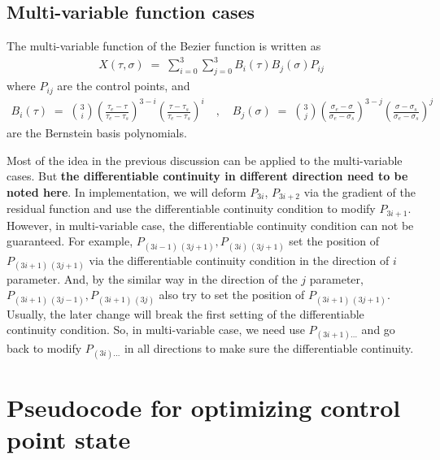 \documentclass[12pt]{article}
\begin{document}
\subsection{Multi-variable function cases}


The multi-variable function of the Bezier function is written as
%
\begin{align}
	X(\tau,\sigma) \;=\; \sum_{i=0}^3 \sum_{j=0}^3 B_i(\tau) B_j(\sigma) P_{ij}
\end{align}
%
where $P_{ij}$ are the control points, and
%
\begin{align*}
	B_i(\tau) \;=\; \binom{3}{i} \left( \frac{\tau_e - \tau}{\tau_e - \tau_s} \right)^{3-i} \left( \frac{\tau - \tau_s}{\tau_e - \tau_s} \right)^{i} \quad,\quad B_j(\sigma) \;=\; \binom{3}{j} \left( \frac{\sigma_e - \sigma}{\sigma_e - \sigma_s} \right)^{3-j} \left( \frac{\sigma - \sigma_s}{\sigma_e - \sigma_s} \right)^{j}
\end{align*}
%
are the Bernstein basis polynomials.


Most of the idea in the previous discussion can be applied to the multi-variable cases.
But \textbf{the differentiable continuity in different direction need to be noted here}.
In implementation, we will deform $P_{3i}$, $P_{3i+2}$ via the gradient of the residual function and use the differentiable continuity condition to modify $P_{3i+1}$.
However, in multi-variable case, the differentiable continuity condition can not be guaranteed.
For example, $P_{(3i-1)\,(3j+1)},P_{(3i)\,(3j+1)}$ set the position of $P_{(3i+1)\,(3j+1)}$ via the differentiable continuity condition in the direction of $i$ parameter.
And, by the similar way in the direction of the $j$ parameter, $P_{(3i+1)\,(3j-1)},P_{(3i+1)\,(3j)}$ also try to set the position of $P_{(3i+1)\,(3j+1)}$.
Usually, the later change will break the first setting of the differentiable continuity condition.
So, in multi-variable case, we need use $P_{(3i+1)...}$ and go back to modify $P_{(3i)...}$ in all directions to make sure the differentiable continuity.





\section{Pseudocode for optimizing control point state}
\end{document}
